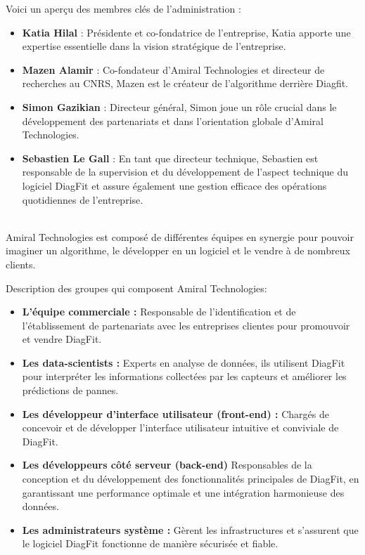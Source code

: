 Voici un aperçu des membres clés de l'administration :
\begin{itemize}
    \item \textbf{Katia Hilal} : Présidente et co-fondatrice de l'entreprise, Katia apporte une expertise essentielle dans la vision stratégique de l'entreprise.
    \item \textbf{Mazen Alamir} : Co-fondateur d'Amiral Technologies et directeur de recherches au CNRS, Mazen est le créateur de l'algorithme derrière Diagfit.
    \item \textbf{Simon Gazikian} : Directeur général, Simon joue un rôle crucial dans le développement des partenariats et dans l'orientation globale d'Amiral Technologies.
    \item \textbf{Sebastien Le Gall} : En tant que directeur technique, Sebastien est responsable de la supervision et du développement de l'aspect technique du logiciel DiagFit et assure également une gestion efficace des opérations quotidiennes de l'entreprise.
\end{itemize}\phantom{vide pour separer}\\

Amiral Technologies est composé de différentes équipes en synergie pour pouvoir imaginer un algorithme, le développer en un logiciel et le vendre à de nombreux clients.

Description des groupes qui composent Amiral Technologies:
\begin{itemize}
    \item \textbf{L'équipe commerciale :} Responsable de l'identification et de l'établissement de partenariats avec les entreprises clientes pour promouvoir et vendre DiagFit.
    \item \textbf{Les data-scientists :} Experts en analyse de données, ils utilisent DiagFit pour interpréter les informations collectées par les capteurs et améliorer les prédictions de pannes.
    \item \textbf{Les développeur d'interface utilisateur (front-end) :} Chargés de concevoir et de développer l'interface utilisateur intuitive et conviviale de DiagFit.
    \item \textbf{Les développeurs côté serveur (back-end)} Responsables de la conception et du développement des fonctionnalités principales de DiagFit, en garantissant une performance optimale et une intégration harmonieuse des données.
    \item \textbf{Les administrateurs système :} Gèrent les infrastructures et s'assurent que le logiciel DiagFit fonctionne de manière sécurisée et fiable.
\end{itemize}

